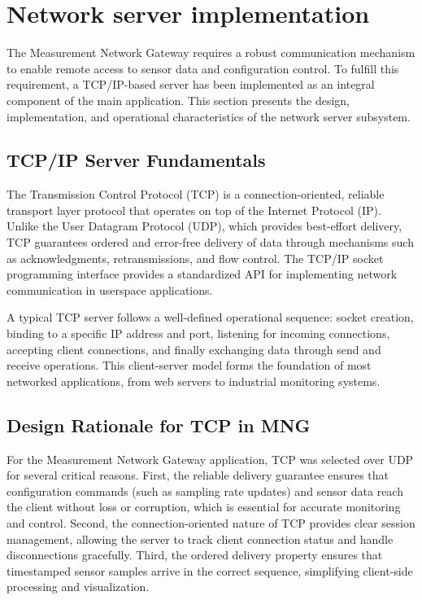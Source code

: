 
























\section{Network server implementation}
The Measurement Network Gateway requires a robust communication mechanism to enable remote access to sensor data and configuration control. To fulfill this requirement, a TCP/IP-based server has been implemented as an integral component of the main application. This section presents the design, implementation, and operational characteristics of the network server subsystem.

\subsection{TCP/IP Server Fundamentals}

The Transmission Control Protocol (TCP) is a connection-oriented, reliable transport layer protocol that operates on top of the Internet Protocol (IP). Unlike the User Datagram Protocol (UDP), which provides best-effort delivery, TCP guarantees ordered and error-free delivery of data through mechanisms such as acknowledgments, retransmissions, and flow control. The TCP/IP socket programming interface provides a standardized API for implementing network communication in userspace applications.

A typical TCP server follows a well-defined operational sequence: socket creation, binding to a specific IP address and port, listening for incoming connections, accepting client connections, and finally exchanging data through send and receive operations. This client-server model forms the foundation of most networked applications, from web servers to industrial monitoring systems.

\subsection{Design Rationale for TCP in MNG}

For the Measurement Network Gateway application, TCP was selected over UDP for several critical reasons. First, the reliable delivery guarantee ensures that configuration commands (such as sampling rate updates) and sensor data reach the client without loss or corruption, which is essential for accurate monitoring and control. Second, the connection-oriented nature of TCP provides clear session management, allowing the server to track client connection status and handle disconnections gracefully. Third, the ordered delivery property ensures that timestamped sensor samples arrive in the correct sequence, simplifying client-side processing and visualization.

